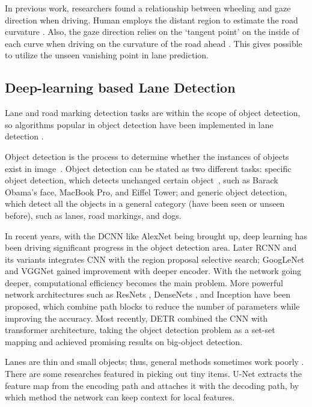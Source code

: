 \begin{spacing}{1.5}
In previous work, researchers found a relationship between wheeling and gaze direction when driving. Human employs the distant region to estimate the road curvature \cite{land1995parts}. Also, the gaze direction relies on the `tangent point' on the inside of each curve when driving on the curvature of the road ahead \cite{land1994we}. This gives possible to utilize the unseen vanishing point in lane prediction.

\subsection{Deep-learning based Lane Detection}

Lane and road marking detection tasks are within the scope of object detection, so algorithms popular in object detection have been implemented in lane detection \cite{tang2020review}. 

Object detection is the process to determine whether the instances of objects exist in image~\cite{liu2020deep}. Object detection can be stated as two different tasks: specific object detection, which detects unchanged certain object~\cite{zhang2013object}, such as Barack Obama’s face, MacBook Pro, and Eiffel Tower; and generic object detection, which detect all the objects in a general category (have been seen or unseen before), such as lanes, road markings, and dogs. 

In recent years, with the DCNN like AlexNet \cite{krizhevsky2012imagenet} being brought up, deep learning has been driving significant progress in the object detection area. Later RCNN and its variants \cite{girshick2014rich, girshick2015fast, ren2015faster} integrates CNN with the region proposal selective search; GoogLeNet \cite{szegedy2015going} and VGGNet \cite{simonyan2014very} gained improvement with deeper encoder. With the network going deeper, computational efficiency becomes the main problem. More powerful network architectures such as ResNets \cite{he2016deep}, DenseNets \cite{huang2017densely}, and Inception \cite{ioffe2015batch} have been proposed, which combine path blocks to reduce the number of parameters while improving the accuracy. Most recently, DETR \cite{carion2020end} combined the CNN with transformer architecture, taking the object detection problem as a set-set mapping and achieved promising results on big-object detection.

Lanes are thin and small objects; thus, general methods sometimes work poorly \cite{tang2020review}. There are some researches featured in picking out tiny items. U-Net \cite{ronneberger2015unet} extracts the feature map from the encoding path and attaches it with the decoding path, by which method the network can keep context for local features.


\end{spacing}
